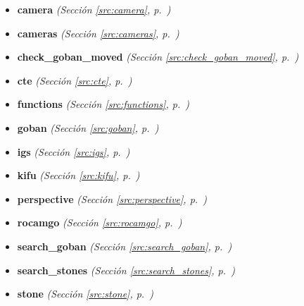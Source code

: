 \begin{itemize}
\setlength{\parskip}{0ex}
\item \textbf{camera}
  \textit{(Sección \ref{src:camera}, p.~\pageref{src:camera})}

\item \textbf{cameras}
  \textit{(Sección \ref{src:cameras}, p.~\pageref{src:cameras})}

\item \textbf{check\_goban\_moved}
  \textit{(Sección \ref{src:check_goban_moved}, p.~\pageref{src:check_goban_moved})}

\item \textbf{cte}
  \textit{(Sección \ref{src:cte}, p.~\pageref{src:cte})}

\item \textbf{functions}
  \textit{(Sección \ref{src:functions}, p.~\pageref{src:functions})}

\item \textbf{goban}
  \textit{(Sección \ref{src:goban}, p.~\pageref{src:goban})}

\item \textbf{igs}
  \textit{(Sección \ref{src:igs}, p.~\pageref{src:igs})}

\item \textbf{kifu}
  \textit{(Sección \ref{src:kifu}, p.~\pageref{src:kifu})}

\item \textbf{perspective}
  \textit{(Sección \ref{src:perspective}, p.~\pageref{src:perspective})}

\item \textbf{rocamgo}
  \textit{(Sección \ref{src:rocamgo}, p.~\pageref{src:rocamgo})}

\item \textbf{search\_goban}
  \textit{(Sección \ref{src:search_goban}, p.~\pageref{src:search_goban})}

\item \textbf{search\_stones}
  \textit{(Sección \ref{src:search_stones}, p.~\pageref{src:search_stones})}

\item \textbf{stone}
  \textit{(Sección \ref{src:stone}, p.~\pageref{src:stone})}

\end{itemize}



